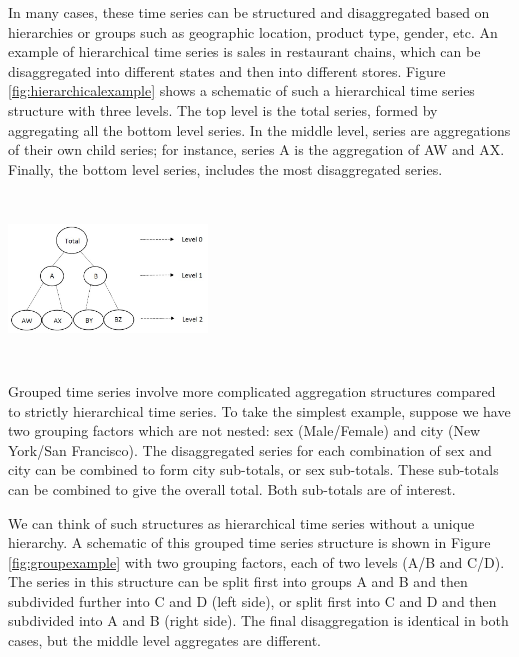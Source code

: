\documentclass[11pt,a4paper,]{article}
\let\origfigure\figure
\let\endorigfigure\endfigure
\renewenvironment{figure}[1][2] {
    \expandafter\origfigure\expandafter[!htbp]
} {
    \endorigfigure
}
\begin{document}
In many cases, these time series can be structured and disaggregated based on hierarchies or groups such as geographic location, product type, gender, etc. An example of hierarchical time series is sales in restaurant chains, which can be disaggregated into different states and then into different stores. Figure \ref{fig:hierarchicalexample} shows a schematic of such a hierarchical time series structure with three levels. The top level is the total series, formed by aggregating all the bottom level series. In the middle level, series are aggregations of their own child series; for instance, series A is the aggregation of AW and AX. Finally, the bottom level series, includes the most disaggregated series.

\begin{figure}

{\centering \includegraphics[width=200px,height=170px,trim=0 0 190 0,clip=true]{Paper-Figures/hierarchical_example} 

}

\caption{An example of a two level hierarchical structure.}\label{fig:hierarchicalexample}
\end{figure}

Grouped time series involve more complicated aggregation structures compared to strictly hierarchical time series. To take the simplest example, suppose we have two grouping factors which are not nested: sex (Male/Female) and city (New York/San Francisco). The disaggregated series for each combination of sex and city can be combined to form city sub-totals, or sex sub-totals. These sub-totals can be combined to give the overall total. Both sub-totals are of interest.

We can think of such structures as hierarchical time series without a unique hierarchy. A schematic of this grouped time series structure is shown in Figure \ref{fig:groupexample} with two grouping factors, each of two levels (A/B and C/D). The series in this structure can be split first into groups A and B and then subdivided further into C and D (left side), or split first into C and D and then subdivided into A and B (right side). The final disaggregation is identical in both cases, but the middle level aggregates are different.
\end{document}
